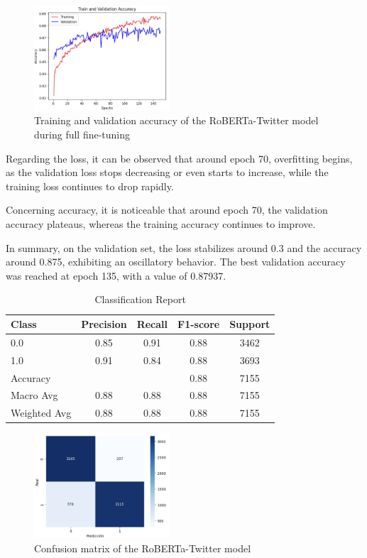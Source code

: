 \begin{figure}[H]
    \centering
    \includegraphics[width=0.45\textwidth]{images/robertaAccuracyFigureY150Epoch.png}
    \caption{Training and validation accuracy of the RoBERTa-Twitter model during full fine-tuning}
    \label{fig:roberta_accuracy_finetune}
\end{figure}



Regarding the loss, it can be observed that around epoch 70, overfitting begins, as the validation loss stops decreasing or even starts to increase, while the training loss continues to drop rapidly. 

Concerning accuracy, it is noticeable that around epoch 70, the validation accuracy plateaus, whereas the training accuracy continues to improve. 

In summary, on the validation set, the loss stabilizes around 0.3 and the accuracy around 0.875, exhibiting an oscillatory behavior. The best validation accuracy was reached at epoch 135, with a value of 0.87937.

\begin{table}[H]
\centering
\caption{Classification Report}
\label{tab:classification_report_2}
\begin{tabular}{lcccc}
\toprule
Class        & Precision & Recall & F1-score & Support \\
\midrule
0.0          & 0.85      & 0.91   & 0.88     & 3462    \\
1.0          & 0.91      & 0.84   & 0.88     & 3693    \\
\midrule
Accuracy     &           &        & 0.88     & 7155    \\
Macro Avg    & 0.88      & 0.88   & 0.88     & 7155    \\
Weighted Avg & 0.88      & 0.88   & 0.88     & 7155    \\
\bottomrule
\end{tabular}
\end{table}

\begin{figure}[H]
    \centering
    \includegraphics[width=0.45\textwidth]{images/robertaConfuctionMatriz.png}
    \caption{Confusion matrix of the RoBERTa-Twitter model}
    \label{fig:roberta_confusion_matrix}
\end{figure}

